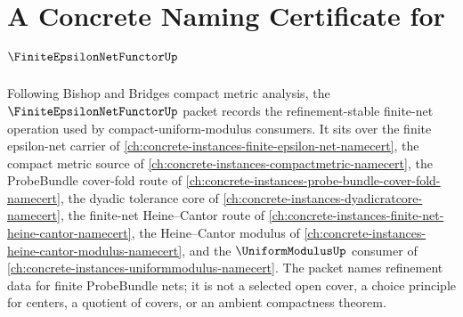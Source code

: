 \chapter{A Concrete Naming Certificate for $\FiniteEpsilonNetFunctorUp$}
\label{ch:concrete-instances-finite-epsilon-net-functor-namecert}

Following Bishop and Bridges compact metric analysis, the $\FiniteEpsilonNetFunctorUp$ packet records the refinement-stable finite-net operation used by compact-uniform-modulus consumers. It sits over the finite epsilon-net carrier of \autoref{ch:concrete-instances-finite-epsilon-net-namecert}, the compact metric source of \autoref{ch:concrete-instances-compactmetric-namecert}, the ProbeBundle cover-fold route of \autoref{ch:concrete-instances-probe-bundle-cover-fold-namecert}, the dyadic tolerance core of \autoref{ch:concrete-instances-dyadicratcore-namecert}, the finite-net Heine--Cantor route of \autoref{ch:concrete-instances-finite-net-heine-cantor-namecert}, the Heine--Cantor modulus of \autoref{ch:concrete-instances-heine-cantor-modulus-namecert}, and the $\UniformModulusUp$ consumer of \autoref{ch:concrete-instances-uniformmodulus-namecert}. The packet names refinement data for finite ProbeBundle nets; it is not a selected open cover, a choice principle for centers, a quotient of covers, or an ambient compactness theorem.

